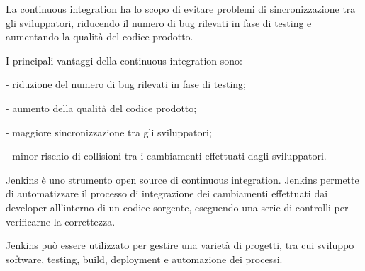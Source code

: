 La continuous integration ha lo scopo di evitare problemi di sincronizzazione tra gli sviluppatori, riducendo il numero di bug rilevati in fase di testing e aumentando la qualità del codice prodotto.

I principali vantaggi della continuous integration sono:

- riduzione del numero di bug rilevati in fase di testing;

- aumento della qualità del codice prodotto;

- maggiore sincronizzazione tra gli sviluppatori;

- minor rischio di collisioni tra i cambiamenti effettuati dagli sviluppatori.

Jenkins è uno strumento open source di continuous integration. Jenkins permette di automatizzare il processo di integrazione dei cambiamenti effettuati dai developer all'interno di un codice sorgente, eseguendo una serie di controlli per verificarne la correttezza.

Jenkins può essere utilizzato per gestire una varietà di progetti, tra cui sviluppo software, testing, build, deployment e automazione dei processi.